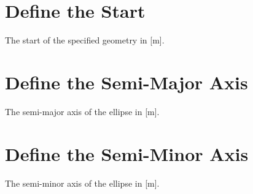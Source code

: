 \section{Define the Start}
\label{sec:S}
The start of the specified geometry in [m].

\section{Define the Semi-Major Axis}
\label{sec:A}
The semi-major axis of the ellipse in [m].

\section{Define the Semi-Minor Axis}
\label{sec:B}
The semi-minor axis of the ellipse in [m].

